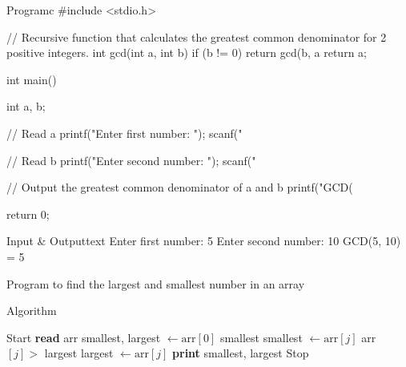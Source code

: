 \documentclass[11pt]{ipu-c}
\begin{document}
    \newpage
    \begin{code}
        {Program}{c}
#include <stdio.h>

// Recursive function that calculates the greatest common denominator for 2 positive integers.
int gcd(int a, int b) {
    if (b != 0) {
        return gcd(b, a %
    }
    return a;
}

int main() {
    int a, b;

    // Read a
    printf("Enter first number: ");
    scanf("%

    // Read b
    printf("Enter second number: ");
    scanf("%

    // Output the greatest common denominator of a and b
    printf("GCD(%

    return 0;
}
    \end{code}
    \begin{code}
        {Input \& Output}{text}
Enter first number: 5
Enter second number: 10
GCD(5, 10) = 5
    \end{code}


    {Program to find the largest and smallest number in an array}

    \begin{tabularsection}{Algorithm}
        \begin{algorithmic}[1]
            \State Start
            \State \textbf{read} arr
            \State smallest, largest $\gets \text{arr}[0]$
            \State smallest
                    \State smallest $\gets \text{arr}[j]$
                \ElsIf
                        {arr$[j] >$ largest}
                    \State largest $\gets \text{arr}[j]$
                \EndIf
            \EndFor
            \State \textbf{print} smallest, largest
            \State Stop
        \end{algorithmic}
    \end{tabularsection}
\end{document}
